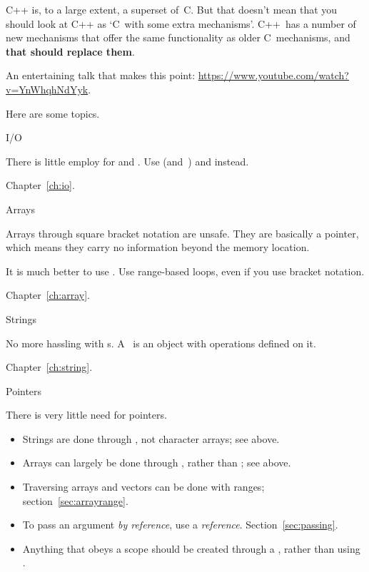 
C++ is, to a large extent, a superset of~C. But that doesn't mean that
you should look at C++ as `C~with some extra mechanisms'. C++~has a
number of new mechanisms that offer the same functionality as older
C~mechanisms, and \textbf{that should replace them}.

An entertaining talk that makes this point:
\url{https://www.youtube.com/watch?v=YnWhqhNdYyk}.

Here are some topics.

 {I/O}

There is little employ for  and
. Use  (and~)
and  instead.

Chapter~\ref{ch:io}.

 {Arrays}

Arrays through square bracket notation are unsafe. They are basically
a pointer, which means they carry no information beyond the memory location.

It is much better
to use . Use range-based loops, even if you use
bracket notation.

Chapter~\ref{ch:array}.

 {Strings}

No more hassling with s. A~ is an object with operations
defined on it.

Chapter~\ref{ch:string}.

 {Pointers}

There is very little need for pointers.
\begin{itemize}
\item Strings are done through , not character arrays;
  see above.
\item Arrays can largely be done through , rather than
  ; see above.
\item Traversing arrays and vectors can be done with ranges;
  section~\ref{sec:arrayrange}.
\item To pass an argument
  \emph{by reference},
  use a \emph{reference}.
  Section~\ref{sec:passing}.
\item Anything that obeys a scope should be created through a
  , rather than using .
\end{itemize}


